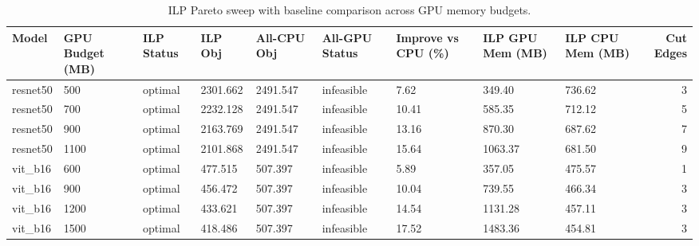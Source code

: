 \begin{table}[t]
\centering
\caption{ILP Pareto sweep with baseline comparison across GPU memory budgets.}
\label{tab:ilp-budget-sweep}
\begin{tabular}{lllllllllr}
\toprule
Model & GPU Budget (MB) & ILP Status & ILP Obj & All-CPU Obj & All-GPU Status & Improve vs CPU (\%) & ILP GPU Mem (MB) & ILP CPU Mem (MB) & Cut Edges \\
\midrule
resnet50 & 500 & optimal & 2301.662 & 2491.547 & infeasible & 7.62 & 349.40 & 736.62 & 3 \\
resnet50 & 700 & optimal & 2232.128 & 2491.547 & infeasible & 10.41 & 585.35 & 712.12 & 5 \\
resnet50 & 900 & optimal & 2163.769 & 2491.547 & infeasible & 13.16 & 870.30 & 687.62 & 7 \\
resnet50 & 1100 & optimal & 2101.868 & 2491.547 & infeasible & 15.64 & 1063.37 & 681.50 & 9 \\
vit_b16 & 600 & optimal & 477.515 & 507.397 & infeasible & 5.89 & 357.05 & 475.57 & 1 \\
vit_b16 & 900 & optimal & 456.472 & 507.397 & infeasible & 10.04 & 739.55 & 466.34 & 3 \\
vit_b16 & 1200 & optimal & 433.621 & 507.397 & infeasible & 14.54 & 1131.28 & 457.11 & 3 \\
vit_b16 & 1500 & optimal & 418.486 & 507.397 & infeasible & 17.52 & 1483.36 & 454.81 & 3 \\
\bottomrule
\end{tabular}

\end{table}
